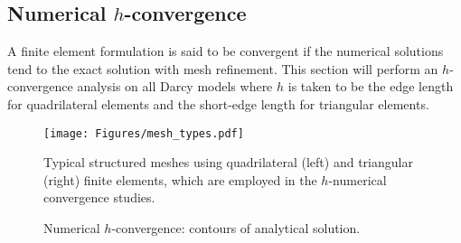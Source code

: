 \documentclass[11pt,reqno]{amsart}
\begin{document}
\subsection{Numerical $h$-convergence}
A finite element formulation is said to be convergent if the numerical solutions tend to the exact 
solution with mesh refinement. This section will perform an $h$-convergence analysis on all Darcy 
models where $h$ is taken to be the edge length for quadrilateral elements and the short-edge length 
for triangular elements.
\begin{figure}[t!]
\centering
  \texttt{[image: Figures/mesh\_types.pdf]}
  \caption{Typical structured meshes using 
    quadrilateral (left) and triangular (right) 
    finite elements, which are employed in the 
    $h$-numerical convergence studies. 
    \label{Fig:meshings}}
\end{figure}
\begin{figure}[h!]
  \centering
  \caption{Numerical $h$-convergence: contours of analytical solution.}
  \label{Fig:Numerical_analytical_solution}
\end{figure}
\end{document}
